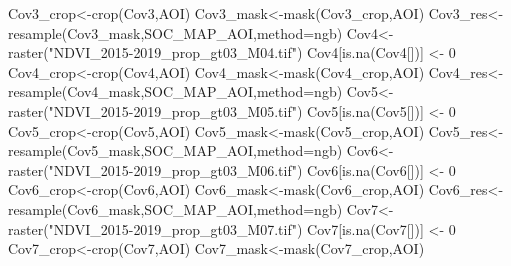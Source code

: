 \documentclass[
  10pt,
  b5paper,
]{book}
\newenvironment{Shaded}{\begin{snugshade}}{\end{snugshade}}
\newcommand{\AttributeTok}[1]{\textcolor[rgb]{0.77,0.63,0.00}{#1}}
\newcommand{\DecValTok}[1]{\textcolor[rgb]{0.00,0.00,0.81}{#1}}
\newcommand{\FunctionTok}[1]{\textcolor[rgb]{0.00,0.00,0.00}{#1}}
\newcommand{\NormalTok}[1]{#1}
\newcommand{\OtherTok}[1]{\textcolor[rgb]{0.56,0.35,0.01}{#1}}
\newcommand{\StringTok}[1]{\textcolor[rgb]{0.31,0.60,0.02}{#1}}
\begin{document}
\begin{Shaded}
\begin{Highlighting}[]
\NormalTok{Cov3\_crop}\OtherTok{\textless{}{-}}\FunctionTok{crop}\NormalTok{(Cov3,AOI)}
\NormalTok{Cov3\_mask}\OtherTok{\textless{}{-}}\FunctionTok{mask}\NormalTok{(Cov3\_crop,AOI)}
\NormalTok{Cov3\_res}\OtherTok{\textless{}{-}}\FunctionTok{resample}\NormalTok{(Cov3\_mask,SOC\_MAP\_AOI,}\AttributeTok{method=}\StringTok{\textquotesingle{}ngb\textquotesingle{}}\NormalTok{) }
\NormalTok{Cov4}\OtherTok{\textless{}{-}}\FunctionTok{raster}\NormalTok{(}\StringTok{"NDVI\_2015{-}2019\_prop\_gt03\_M04.tif"}\NormalTok{)}
\NormalTok{Cov4[}\FunctionTok{is.na}\NormalTok{(Cov4[])] }\OtherTok{\textless{}{-}} \DecValTok{0}
\NormalTok{Cov4\_crop}\OtherTok{\textless{}{-}}\FunctionTok{crop}\NormalTok{(Cov4,AOI)}
\NormalTok{Cov4\_mask}\OtherTok{\textless{}{-}}\FunctionTok{mask}\NormalTok{(Cov4\_crop,AOI)}
\NormalTok{Cov4\_res}\OtherTok{\textless{}{-}}\FunctionTok{resample}\NormalTok{(Cov4\_mask,SOC\_MAP\_AOI,}\AttributeTok{method=}\StringTok{\textquotesingle{}ngb\textquotesingle{}}\NormalTok{) }
\NormalTok{Cov5}\OtherTok{\textless{}{-}}\FunctionTok{raster}\NormalTok{(}\StringTok{"NDVI\_2015{-}2019\_prop\_gt03\_M05.tif"}\NormalTok{)}
\NormalTok{Cov5[}\FunctionTok{is.na}\NormalTok{(Cov5[])] }\OtherTok{\textless{}{-}} \DecValTok{0}
\NormalTok{Cov5\_crop}\OtherTok{\textless{}{-}}\FunctionTok{crop}\NormalTok{(Cov5,AOI)}
\NormalTok{Cov5\_mask}\OtherTok{\textless{}{-}}\FunctionTok{mask}\NormalTok{(Cov5\_crop,AOI)}
\NormalTok{Cov5\_res}\OtherTok{\textless{}{-}}\FunctionTok{resample}\NormalTok{(Cov5\_mask,SOC\_MAP\_AOI,}\AttributeTok{method=}\StringTok{\textquotesingle{}ngb\textquotesingle{}}\NormalTok{) }
\NormalTok{Cov6}\OtherTok{\textless{}{-}}\FunctionTok{raster}\NormalTok{(}\StringTok{"NDVI\_2015{-}2019\_prop\_gt03\_M06.tif"}\NormalTok{)}
\NormalTok{Cov6[}\FunctionTok{is.na}\NormalTok{(Cov6[])] }\OtherTok{\textless{}{-}} \DecValTok{0}
\NormalTok{Cov6\_crop}\OtherTok{\textless{}{-}}\FunctionTok{crop}\NormalTok{(Cov6,AOI)}
\NormalTok{Cov6\_mask}\OtherTok{\textless{}{-}}\FunctionTok{mask}\NormalTok{(Cov6\_crop,AOI)}
\NormalTok{Cov6\_res}\OtherTok{\textless{}{-}}\FunctionTok{resample}\NormalTok{(Cov6\_mask,SOC\_MAP\_AOI,}\AttributeTok{method=}\StringTok{\textquotesingle{}ngb\textquotesingle{}}\NormalTok{) }
\NormalTok{Cov7}\OtherTok{\textless{}{-}}\FunctionTok{raster}\NormalTok{(}\StringTok{"NDVI\_2015{-}2019\_prop\_gt03\_M07.tif"}\NormalTok{)}
\NormalTok{Cov7[}\FunctionTok{is.na}\NormalTok{(Cov7[])] }\OtherTok{\textless{}{-}} \DecValTok{0}
\NormalTok{Cov7\_crop}\OtherTok{\textless{}{-}}\FunctionTok{crop}\NormalTok{(Cov7,AOI)}
\NormalTok{Cov7\_mask}\OtherTok{\textless{}{-}}\FunctionTok{mask}\NormalTok{(Cov7\_crop,AOI)}

\end{Highlighting}
\end{Shaded}
\end{document}
